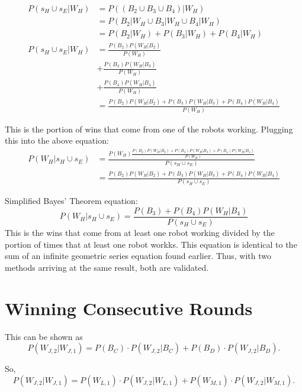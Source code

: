 \documentclass[11pt]{article}
\begin{document}
\begin{align*}
    P(s_H \cup s_E | W_H) &= P((B_2 \cup B_3 \cup B_4)| W_H)\\
    &= P(B_2 | W_H \cup B_3 | W_H \cup B_4 | W_H) \\
    &=P(B_2 | W_H) + P(B_3 | W_H) + P(B_4 | W_H)\\
    P(s_H \cup s_E | W_H) &= \frac{P(B_2) P(W_H | B_2)}{P(W_H)}\\
    &+ \frac{P(B_3)P(W_H | B_3)}{P(W_H)}\\
    &+ \frac{P(B_4)P(W_H | B_4)}{P(W_H)}\\
    &= \frac{P(B_2) P(W_H | B_2) + P(B_3)P(W_H | B_3) + P(B_4)P(W_H | B_4)}{P(W_H)}
\end{align*}

This is the portion of wins that come from one of the robots working. Plugging this 
into the above equation:
\begin{align*}
    P(W_H | s_H \cup s_E) &= \frac{P(W_H) \frac{P(B_2) P(W_H | B_2) + P(B_3)P(W_H | B_3) + P(B_4)P(W_H | B_4)}{P(W_H)}}{P(s_H \cup s_E)}\\
    &= \frac{P(B_2) P(W_H | B_2) + P(B_3)P(W_H | B_3) + P(B_4)P(W_H | B_4)}{P(s_H \cup s_E)}
\end{align*}

Simplified Bayes' Theorem equation:
\begin{equation*}
    P(W_H | s_H \cup s_E) = \frac{P(B_3) + P(B_4)P(W_H | B_4)}{P(s_H \cup s_E)}
\end{equation*}
This is the wins that come from at least one robot working divided by the portion of times that at least
one robot workks. This equation is identical to the sum of an infinite geometric series equation found earlier.
Thus, with two methods arriving at the same result, both are validated.

\section{Winning Consecutive Rounds}


This can be shown as
\begin{equation*}
    P(W_{J, 2} | W_{J, 1}) = P(B_C) \cdot P(W_{J, 2} | B_C) + P(B_D) \cdot P(W_{J, 2} | B_D).
\end{equation*}

So,
\begin{equation*}
    P(W_{J, 2} | W_{J, 1}) = P(W_{L, 1}) \cdot P(W_{J, 2} | W_{L, 1}) + P(W_{M, 1}) \cdot P(W_{J, 2} | W_{M, 1}).
\end{equation*}
\end{document}
